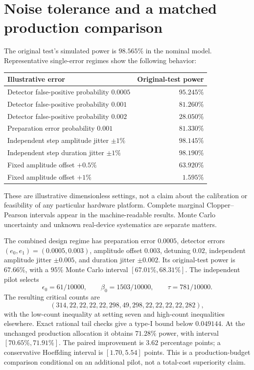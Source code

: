 \section{Noise tolerance and a matched production comparison}
The original test's simulated power is $98.565\%$ in the nominal model.
Representative single-error regimes show the following behavior:
\begin{center}
\begin{tabular}{lr}
Illustrative error & Original-test power\\
\hline
Detector false-positive probability $0.0005$ & $95.245\%$\\
Detector false-positive probability $0.001$ & $81.260\%$\\
Detector false-positive probability $0.002$ & $28.050\%$\\
Preparation error probability $0.001$ & $81.330\%$\\
Independent step amplitude jitter $\pm1\%$ & $98.145\%$\\
Independent step duration jitter $\pm1\%$ & $98.190\%$\\
Fixed amplitude offset $+0.5\%$ & $63.920\%$\\
Fixed amplitude offset $+1\%$ & $1.595\%$
\end{tabular}
\end{center}
These are illustrative dimensionless settings, not a claim about the calibration
or feasibility of any particular hardware platform. Complete marginal
Clopper--Pearson intervals appear in the machine-readable results. Monte Carlo
uncertainty and unknown real-device systematics are separate matters.

The combined design regime has preparation error $0.0005$, detector errors
$(e_0,e_1)=(0.0005,0.003)$, amplitude offset $0.003$, detuning $0.02$, independent
amplitude jitter $\pm0.005$, and duration jitter $\pm0.002$. Its original-test
power is $67.66\%$, with a $95\%$ Monte Carlo interval
$[67.01\%,68.31\%]$. The independent pilot selects
\[
 \epsilon_0=61/10000,\qquad \beta_0=1503/10000,
 \qquad \tau=781/10000.
\]
The resulting critical counts are
\[
 (314,22,22,22,22,298,49,298,22,22,22,22,282),
\]
with the low-count inequality at setting seven and high-count inequalities
elsewhere. Exact rational tail checks give a type-I bound below $0.049144$.
At the unchanged production allocation it obtains $71.28\%$ power, with
interval $[70.65\%,71.91\%]$. The paired improvement is $3.62$ percentage
points; a conservative Hoeffding interval is $[1.70,5.54]$ points.
This is a production-budget comparison conditional on an additional pilot,
not a total-cost superiority claim.

